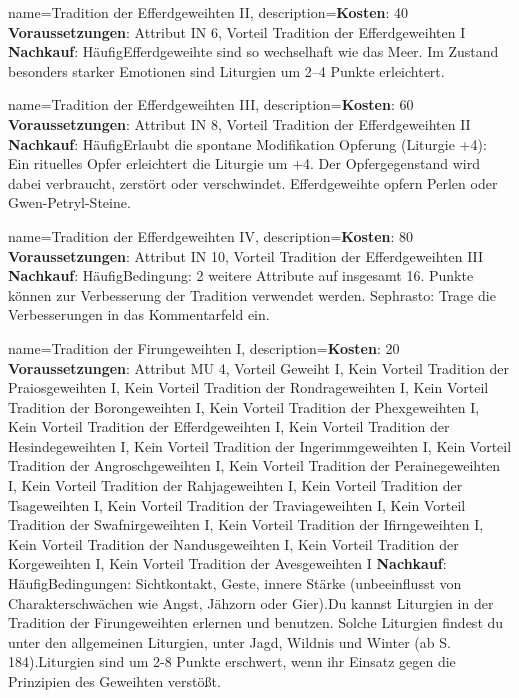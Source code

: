 {
    name={Tradition der Efferdgeweihten II},
    description={\textbf{Kosten}: 40 \textbf{Voraussetzungen}: Attribut IN 6, Vorteil Tradition der Efferdgeweihten I \textbf{Nachkauf}: Häufig\newline Efferdgeweihte sind so wechselhaft wie das Meer. Im Zustand besonders starker Emotionen sind Liturgien um 2–4 Punkte erleichtert.}
}


{
    name={Tradition der Efferdgeweihten III},
    description={\textbf{Kosten}: 60 \textbf{Voraussetzungen}: Attribut IN 8, Vorteil Tradition der Efferdgeweihten II \textbf{Nachkauf}: Häufig\newline Erlaubt die spontane Modifikation Opferung (Liturgie +4): Ein rituelles Opfer erleichtert die Liturgie um +4. Der Opfergegenstand wird dabei verbraucht, zerstört oder verschwindet. Efferdgeweihte opfern Perlen oder Gwen-­Petryl-­Steine.}
}


{
    name={Tradition der Efferdgeweihten IV},
    description={\textbf{Kosten}: 80 \textbf{Voraussetzungen}: Attribut IN 10, Vorteil Tradition der Efferdgeweihten III \textbf{Nachkauf}: Häufig\newline Bedingung: 2 weitere Attribute auf insgesamt 16. Punkte können zur Verbesserung der Tradition verwendet werden. Sephrasto: Trage die Verbesserungen in das Kommentarfeld ein.}
}


{
    name={Tradition der Firungeweihten I},
    description={\textbf{Kosten}: 20 \textbf{Voraussetzungen}: Attribut MU 4, Vorteil Geweiht I, Kein Vorteil Tradition der Praiosgeweihten I, Kein Vorteil Tradition der Rondrageweihten I, Kein Vorteil Tradition der Borongeweihten I, Kein Vorteil Tradition der Phexgeweihten I, Kein Vorteil Tradition der Efferdgeweihten I, Kein Vorteil Tradition der Hesindegeweihten I, Kein Vorteil Tradition der Ingerimmgeweihten I, Kein Vorteil Tradition der Angroschgeweihten I, Kein Vorteil Tradition der Perainegeweihten I, Kein Vorteil Tradition der Rahjageweihten I, Kein Vorteil Tradition der Tsageweihten I, Kein Vorteil Tradition der Traviageweihten I, Kein Vorteil Tradition der Swafnirgeweihten I, Kein Vorteil Tradition der Ifirngeweihten I, Kein Vorteil Tradition der Nandusgeweihten I, Kein Vorteil Tradition der Korgeweihten I, Kein Vorteil Tradition der Avesgeweihten I \textbf{Nachkauf}: Häufig\newline Bedingungen: Sichtkontakt, Geste, innere Stärke (unbeeinflusst von Charakterschwächen wie Angst, Jähzorn oder Gier).\newline Du kannst Liturgien in der Tradition der Firungeweihten erlernen und benutzen. Solche Liturgien findest du unter den allgemeinen Liturgien, unter Jagd, Wildnis und Winter (ab S. 184).\newline Liturgien sind um 2-8 Punkte erschwert, wenn ihr Einsatz gegen die Prinzipien des Geweihten verstößt.}
}


